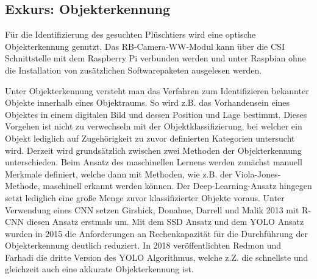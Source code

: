 \subsection{Exkurs: Objekterkennung}



Für die Identifizierung des gesuchten Plüschtiers wird eine optische Objekterkennung genutzt.
Das RB-Camera-WW-Modul kann über die \ac{CSI} Schnittstelle mit dem Raspberry Pi verbunden werden und unter Raspbian ohne die Installation von zusätzlichen Softwarepaketen ausgelesen werden.

Unter Objekterkennung versteht man das Verfahren zum Identifizieren bekannter Objekte innerhalb eines Objektraums. So wird z.B. das Vorhandensein eines Objektes in einem digitalen Bild und dessen Position und Lage bestimmt.
Dieses Vorgehen ist nicht zu verwechseln mit der Objektklassifizierung, bei welcher ein Objekt lediglich auf Zugehörigkeit zu zuvor definierten Kategorien untersucht wird.
Derzeit wird grundsätzlich zwischen zwei Methoden der Objekterkennung unterschieden.
Beim Ansatz des maschinellen Lernens werden zunächst manuell Merkmale definiert, welche dann mit Methoden, wie z.B. der Viola-Jones-Methode, maschinell erkannt werden können.
Der Deep-Learning-Ansatz hingegen setzt lediglich eine große Menge zuvor klassifizierter Objekte voraus.
Unter Verwendung eines \ac{CNN} setzen Girshick, Donahue, Darrell und Malik 2013 mit \ac{R-CNN} diesen Ansatz erstmals um.
Mit dem \ac{SSD} Ansatz und dem \ac{YOLO} Ansatz wurden in 2015 die Anforderungen an Rechenkapazität für die Durchführung der Objekterkennung deutlich reduziert.
In 2018 veröffentlichten Redmon und Farhadi die dritte Version des \ac{YOLO} Algorithmus, welche z.Z. die schnellste und gleichzeit auch eine akkurate Objekterkennung ist.

